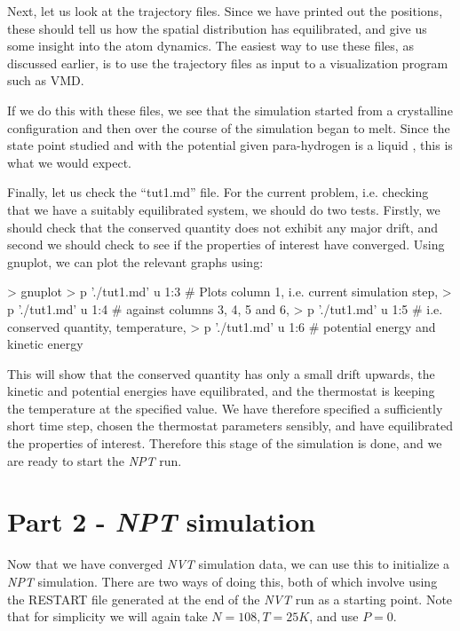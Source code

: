 \documentclass[11pt,english,fleqn]{report}
\newenvironment{code}{%
\footnotesize 
\verbatim
}{
\endverbatim
\normalsize
}
\begin{document}
Next, let us look at the trajectory files. Since we have printed out
the positions, these should tell us how the spatial distribution
has equilibrated, and give us some insight into the atom dynamics.
The easiest way to use these files, as discussed earlier, is to
use the trajectory files as input to a visualization program such as VMD.

If we do this with these files, we see that the simulation started
from a crystalline configuration and then over the course
of the simulation began to melt. Since the state point studied
and with the potential given para-hydrogen is a liquid \cite{silv-gold78jcp},
this is what we would expect.

Finally, let us check the {}``tut1.md'' file. For the current
problem, i.e. checking that we have a suitably equilibrated system,
we should do two tests. Firstly,
we should check that the conserved quantity does not exhibit any major
drift, and second we should check to see if the properties of interest
have converged. Using gnuplot, we can plot the relevant graphs using:

\begin{code}
> gnuplot
> p './tut1.md' u 1:3 # Plots column 1, i.e. current simulation step, 
> p './tut1.md' u 1:4 # against columns 3, 4, 5 and 6,
> p './tut1.md' u 1:5 # i.e. conserved quantity, temperature,
> p './tut1.md' u 1:6 # potential energy and kinetic energy
\end{code}

This will show that the conserved quantity has only a small drift upwards,
the kinetic and potential energies have equilibrated, and the thermostat
is keeping the temperature at the specified value.
We have therefore specified a sufficiently short time step, chosen the
thermostat parameters sensibly, and have equilibrated the properties
of interest.
Therefore this stage of the simulation is done, and we are ready
to start the \emph{NPT} run.

\section{Part 2 - \emph{NPT} simulation}

\label{part2}

Now that we have converged \emph{NVT} simulation data, we can use this to
initialize a \emph{NPT} simulation. 
There are two ways of doing this,
both of which involve using the RESTART file generated at
the end of the \emph{NVT} run as a starting point.
Note that for simplicity we will again take \(N=108, T=25 K\), and use
\(P=0\).
\end{document}
